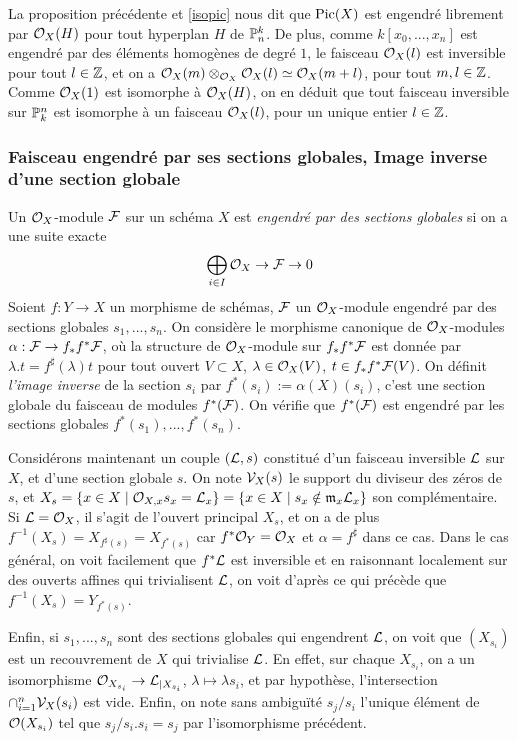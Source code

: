 La proposition précédente et \ref{isopic} nous dit que $\operatorname{Pic}(X)$ est engendré librement par $\mathcal{O}_X(H)$ pour tout hyperplan $H$ de $\mathbb{P}_n^k$. De plus, comme $k[x_0,...,x_n]$ est engendré par des éléments homogènes de degré $1$, le faisceau $\mathcal{O}_X(l)$ est inversible pour tout $l\in \mathbb{Z}$, et on a $\mathcal{O}_X(m)\otimes_{\mathcal{O}_X}\mathcal{O}_X(l)\simeq \mathcal{O}_X(m+l)$, pour tout $m,l\in \mathbb{Z}$. Comme $\mathcal{O}_X(1)$ est isomorphe à $\mathcal{O}_X(H)$, on en déduit que tout faisceau inversible sur $\mathbb{P}_k^n$ est isomorphe à un faisceau $\mathcal{O}_X(l)$, pour un unique entier $l\in \mathbb{Z}$.

\subsubsection{Faisceau engendré par ses sections globales, Image inverse d'une section globale}
\noindent Un $\mathcal{O}_X$-module $\mathcal{F}$ sur un schéma $X$ est \textit{engendré par des sections globales} si on a une suite exacte 
$$\bigoplus_{i\in I}\mathcal{O}_X\rightarrow \mathcal{F}\rightarrow 0$$
Soient $f:Y\rightarrow X$ un morphisme de schémas, $\mathcal{F}$ un $\mathcal{O}_X$-module engendré par des sections globales $s_1,...,s_n$. On considère le morphisme canonique de $\mathcal{O}_X$-modules $\alpha:\mathcal{F}\rightarrow f_*f^*\mathcal{F}$, où la structure de $\mathcal{O}_X$-module sur $f_*f^*\mathcal{F}$ est donnée par $\lambda.t=f^\sharp(\lambda)t$ pour tout ouvert $V\subset X$, $\lambda\in \mathcal{O}_X(V)$, $t\in f_*f^*\mathcal{F}(V)$. On définit \textit{l'image inverse} de la section $s_i$ par $f^*(s_i):=\alpha(X)(s_i)$, c'est une section globale du faisceau de modules $f^*(\mathcal{F})$. On vérifie que $f^*(\mathcal{F})$ est engendré par les sections globales $f^*(s_1),...,f^*(s_n)$.

Considérons maintenant un couple $(\mathcal{L},s)$ constitué d'un faisceau inversible $\mathcal{L}$ sur $X$, et d'une section globale $s$. On note $\mathcal{V}_X(s)$ le support du diviseur des zéros de $s$, et $X_{s}=\lbrace x\in X\mid \mathcal{O}_{X,x}s_x=\mathcal{L}_x\rbrace=\lbrace x\in X\mid s_x\notin \mathfrak{m}_x\mathcal{L}_x\rbrace$ son complémentaire. Si $\mathcal{L}=\mathcal{O}_X$, il s'agit de l'ouvert principal $X_s$, et on a de plus $f^{-1}(X_s)=X_{f^\sharp(s)}=X_{f^*(s)}$ car $f^*\mathcal{O}_Y=\mathcal{O}_X$ et $\alpha=f^\sharp$ dans ce cas. Dans le cas général, on voit facilement que $f^*\mathcal{L}$ est inversible et en raisonnant localement sur des ouverts affines qui trivialisent $\mathcal{L}$, on voit d'après ce qui précède que $f^{-1}(X_s)=Y_{f^*(s)}$.  

Enfin, si $s_1,...,s_n$ sont des sections globales qui engendrent $\mathcal{L}$, on voit que $(X_{s_i})$ est un recouvrement de $X$ qui trivialise $\mathcal{L}$. En effet, sur chaque $X_{s_i}$, on a un isomorphisme $\mathcal{O}_{X_{s_i}}\rightarrow \mathcal{L}_{|X_{s_i}}$, $\lambda \mapsto \lambda s_i$, et par hypothèse, l'intersection $\cap_{i=1}^n \mathcal{V}_X(s_i)$ est vide. Enfin, on note sans ambiguïté $s_j/s_i$ l'unique élément de $\mathcal{O}(X_{s_i})$ tel que $s_j/s_i.s_i=s_j$ par l'isomorphisme précédent.

